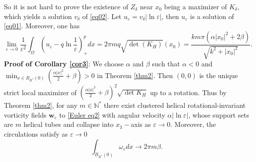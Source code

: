 \documentclass[12pt,reqno]{amsart}
\numberwithin{equation}{section}
\theoremstyle{definition}
\theoremstyle{remark}
\begin{document}
So it is not hard to prove  the existence of $ Z_{\delta} $ near $ x_0 $ being a maximizer of $ K_\delta  $, which yields a solution $ v_\delta $ of \eqref{eq02}. Let $ u_\varepsilon=v_\delta|\ln\varepsilon| $, then $ u_\varepsilon $ is a solution of \eqref{eq01}. Moreover, one has
\begin{equation*}
\lim_{\varepsilon\to 0}\frac{1}{\varepsilon^2}\int_{\Omega}\left( u_\varepsilon-q\ln\frac{1}{\varepsilon}\right)^{p}_+dx=2\pi m q \sqrt{\det(K_H)}(x_0)=\frac{km\pi(\alpha|x_0|^2+2\beta)}{\sqrt{k^2+|x_0|^2}}.
\end{equation*}
\textbf{Proof of  Corollary \ref{cor3}}: We choose $ \alpha $ and $ \beta $ such that $ \alpha<0 $ and $ \min_{x\in B_{R^*}(0)}\left( \frac{\alpha|x|^2}{2}+\beta\right)>0 $ in Theorem \ref{thm2}. Then $ (0,0) $ is the unique strict local maximizer of $ \left( \frac{\alpha|x|^2}{2}+\beta\right)^2\sqrt{\det K_H} $ up to a rotation. Thus by Theorem \ref{thm2}, for any $ m\in \mathbb{N}^* $ there exist clustered helical rotational-invariant vorticity fields $ \textbf{w}_\varepsilon $ to \eqref{Euler eq2}  with angular velocity $ \alpha|\ln\varepsilon| $, whose support sets are $ m $ helical tubes and collapse into $ x_3- $axis as $\varepsilon\to 0$. Moreover, the circulations satisfy as $\varepsilon\to 0$
\begin{equation*}
\int_{B_{R^*}(0)} \omega_\varepsilon dx\to 2\pi m \beta.
\end{equation*}
 
\fi



\iffalse
\end{document}
